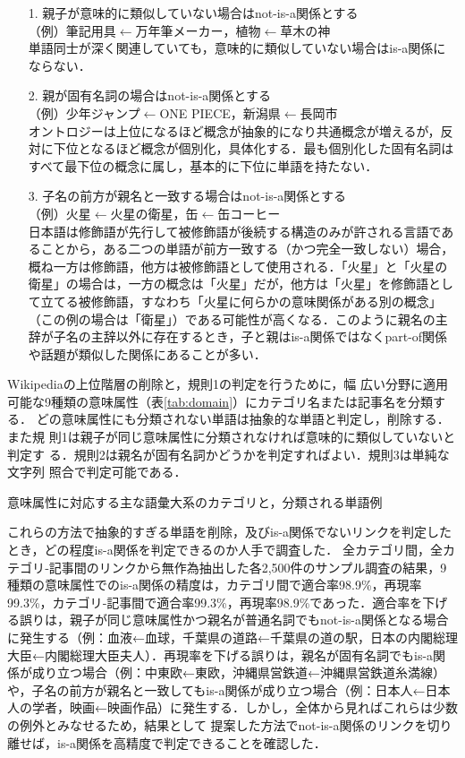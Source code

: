 \documentclass[japanese]{jnlp_1.4}
\begin{document}
\begin{itemize}
\item[1.]
親子が意味的に類似していない場合はnot-is-a関係とする\\
（例）筆記用具$\gets$万年筆メーカー，植物$\gets$草木の神\\
単語同士が深く関連していても，意味的に類似していない場合はis-a関係にならない．
\item[2.]
親が固有名詞の場合はnot-is-a関係とする\\
（例）少年ジャンプ$\gets$ONE PIECE，新潟県$\gets$長岡市\\
オントロジーは上位になるほど概念が抽象的になり共通概念が増えるが，反対に下位となるほど概念が個別化，具体化する．最も個別化した固有名詞はすべて最下位の概念に属し，基本的に下位に単語を持たない．
\item[3.]
子名の前方が親名と一致する場合はnot-is-a関係とする\\
（例）火星$\gets$火星の衛星，缶$\gets$缶コーヒー\\
日本語は修飾語が先行して被修飾語が後続する構造のみが許される言語であることから，ある二つの単語が前方一致する（かつ完全一致しない）場合，概ね一方は修飾語，他方は被修飾語として使用される．「火星」と「火星の衛星」の場合は，一方の概念は「火星」だが，他方は「火星」を修飾語として立てる被修飾語，すなわち「火星に何らかの意味関係がある別の概念」（この例の場合は「衛星」）である可能性が高くなる．このように親名の主辞が子名の主辞以外に存在するとき，子と親はis-a関係ではなくpart-of関係や話題が類似した関係にあることが多い．
\end{itemize}

\noindent
Wikipediaの上位階層の削除と，規則1の判定を行うために，幅
広い分野に適用可能な9種類の意味属性（表\ref{tab:domain}）にカテゴリ名または記事名を分類する．
どの意味属性にも分類されない単語は抽象的な単語と判定し，削除する．また規
則1は親子が同じ意味属性に分類されなければ意味的に類似していないと判定す
る．規則2は親名が固有名詞かどうかを判定すればよい．規則3は単純な文字列
照合で判定可能である．

\begin{table}[t]
\caption{意味属性に対応する主な語彙大系のカテゴリと，分類される単語例}
\label{tab:domain}

\end{table}

これらの方法で抽象的すぎる単語を削除，及びis-a関係でないリンクを判定したとき，どの程度is-a関係を判定できるのか人手で調査した．
全カテゴリ間，全カテゴリ‐記事間のリンクから無作為抽出した各2,500件のサンプル調査の結果，9種類の意味属性でのis-a関係の精度は，カテゴリ間で適合率98.9\%，再現率99.3\%，カテゴリ‐記事間で適合率99.3\%，再現率98.9\%であった．適合率を下げる誤りは，親子が同じ意味属性かつ親名が普通名詞でもnot-is-a関係となる場合に発生する（例：血液←血球，千葉県の道路←千葉県の道の駅，日本の内閣総理大臣←内閣総理大臣夫人）．再現率を下げる誤りは，親名が固有名詞でもis-a関係が成り立つ場合（例：中東欧←東欧，沖縄県営鉄道←沖縄県営鉄道糸満線）や，子名の前方が親名と一致してもis-a関係が成り立つ場合（例：日本人←日本人の学者，映画←映画作品）に発生する．しかし，全体から見ればこれらは少数の例外とみなせるため，結果として
提案した方法でnot-is-a関係のリンクを切り離せば，is-a関係を高精度で判定できることを確認した．
\end{document}
